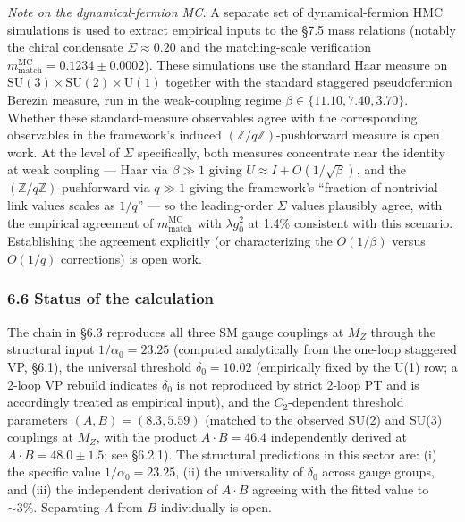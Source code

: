 \documentclass[
]{article}
\begin{document}
\emph{Note on the dynamical-fermion MC.} A separate set of
dynamical-fermion HMC simulations is used to extract empirical inputs to
the §7.5 mass relations (notably the chiral condensate
\(\Sigma \approx 0.20\) and the matching-scale verification
\(m_{\text{match}}^{\text{MC}} = 0.1234 \pm 0.0002\)). These simulations
use the standard Haar measure on
\(\mathrm{SU}(3) \times \mathrm{SU}(2) \times \mathrm{U}(1)\) together
with the standard staggered pseudofermion Berezin measure, run in the
weak-coupling regime \(\beta \in \{11.10, 7.40, 3.70\}\). Whether these
standard-measure observables agree with the corresponding observables in
the framework's induced \((\mathbb{Z}/q\mathbb{Z})\)-pushforward measure
is open work. At the level of \(\Sigma\) specifically, both measures
concentrate near the identity at weak coupling --- Haar via
\(\beta \gg 1\) giving \(U \approx I + O(1/\sqrt\beta)\), and the
\((\mathbb{Z}/q\mathbb{Z})\)-pushforward via \(q \gg 1\) giving the
framework's ``fraction of nontrivial link values scales as \(1/q\)'' ---
so the leading-order \(\Sigma\) values plausibly agree, with the
empirical agreement of \(m_{\text{match}}^{\text{MC}}\) with
\(\lambda g_0^2\) at 1.4\% consistent with this scenario. Establishing
the agreement explicitly (or characterizing the \(O(1/\beta)\) versus
\(O(1/q)\) corrections) is open work.

\hypertarget{status-of-the-calculation}{%
\subsubsection{6.6 Status of the
calculation}\label{status-of-the-calculation}}

The chain in §6.3 reproduces all three SM gauge couplings at \(M_Z\)
through the structural input \(1/\alpha_0 = 23.25\) (computed
analytically from the one-loop staggered VP, §6.1), the universal
threshold \(\delta_0 = 10.02\) (empirically fixed by the U(1) row; a
2-loop VP rebuild indicates \(\delta_0\) is not reproduced by strict
2-loop PT and is accordingly treated as empirical input), and the
\(C_2\)-dependent threshold parameters \((A, B) = (8.3, 5.59)\) (matched
to the observed SU(2) and SU(3) couplings at \(M_Z\), with the product
\(A \cdot B = 46.4\) independently derived at
\(A \cdot B = 48.0 \pm 1.5\); see §6.2.1). The structural predictions in
this sector are: (i) the specific value \(1/\alpha_0 = 23.25\), (ii) the
universality of \(\delta_0\) across gauge groups, and (iii) the
independent derivation of \(A \cdot B\) agreeing with the fitted value
to \(\sim 3\%\). Separating \(A\) from \(B\) individually is open.
\end{document}
